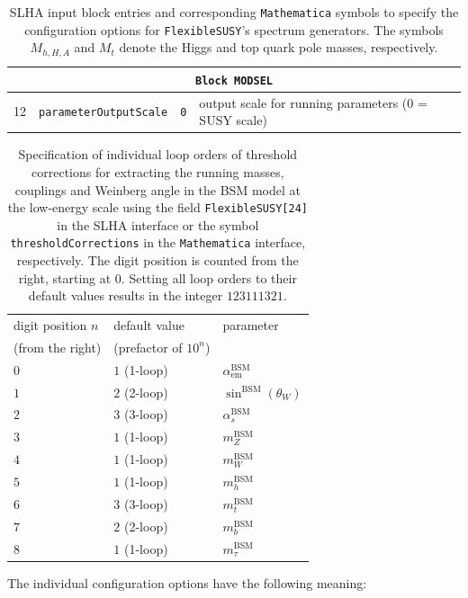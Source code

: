 \documentclass[final,3p,11pt,pdflatex]{elsarticle}
\makeatletter
\newcommand{\fs}{\texttt{FlexibleSUSY}\@\xspace}
\newcommand{\mathematica}{\texttt{Ma\-the\-ma\-ti\-ca}\xspace}
\newcommand{\code}[1]{\lstinline|#1|}  %
\newcommand{\BSM}{\ensuremath{\text{BSM}}\xspace}
\def\as{\alpha_s}
\makeatother
\begin{document}
\begin{table}
{\begin{tabularx}{1.2\textwidth}{lllX}
    \midrule
    \multicolumn{4}{c}{\texttt{Block MODSEL}}\\
    \midrule
    12 & \code{parameterOutputScale}          & \code{0} &
    output scale for running parameters (0 = SUSY scale)\\
    \bottomrule
  \end{tabularx}}
  \caption{SLHA input block entries and corresponding \mathematica
    symbols to specify the configuration options for \fs's spectrum
    generators.  The symbols $M_{h,H,A}$ and $M_t$ denote the Higgs
    and top quark pole masses, respectively.}
  \label{tab:sg_mma_options}
\end{table}
%
\begin{table}[tbh]
  \centering
  \begin{tabular}{lll}
    \toprule
    digit position $n$    & default value & parameter \\
    (from the right) & (prefactor of $10^n$) & \\
    \midrule
    $0$ & $1$ (1-loop) & $\alpha^\BSM_{\text{em}}$ \\
    $1$ & $2$ (2-loop) & $\sin^\BSM(\theta_W)$ \\
    $2$ & $3$ (3-loop) & $\as^\BSM$ \\
    $3$ & $1$ (1-loop) & $m^\BSM_Z$ \\
    $4$ & $1$ (1-loop) & $m^\BSM_W$ \\
    $5$ & $1$ (1-loop) & $m^\BSM_h$ \\
    $6$ & $3$ (3-loop) & $m^\BSM_t$ \\
    $7$ & $2$ (2-loop) & $m^\BSM_b$ \\
    $8$ & $1$ (1-loop) & $m^\BSM_\tau$ \\
    \bottomrule
  \end{tabular}
  \caption{Specification of individual loop orders of threshold
    corrections for extracting the running masses, couplings and
    Weinberg angle in the BSM model at the low-energy scale using the
    field \texttt{FlexibleSUSY[24]} in the SLHA interface or the
    symbol \texttt{thresholdCorrections} in the \mathematica
    interface, respectively.  The digit position is counted from the
    right, starting at $0$.  Setting all loop orders to their default
    values results in the integer $123111321$.}
  \label{tab:sg_mma_tc}
\end{table}
%
The individual configuration options have the following meaning:
%
\end{document}
